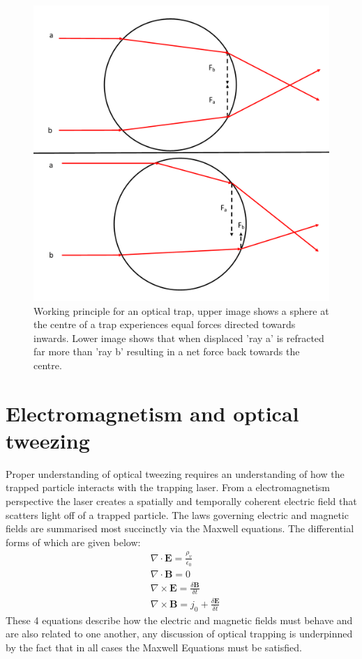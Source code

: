 \documentclass[a4paper,oneside,11pt]{book}
\begin{document}
\begin{figure}[h]
	\centering
	\includegraphics[width=0.65\linewidth]{ot_working_principal.png}
	\caption{Working principle for an optical trap, upper image shows a sphere at the centre of a trap experiences equal forces directed towards inwards. Lower image shows that when displaced 'ray a' is refracted far more than 'ray b' resulting in a net force back towards the centre.}
\end{figure}

\section{Electromagnetism and optical tweezing}
Proper understanding of optical tweezing requires an understanding of how the trapped particle interacts with the trapping laser. From a electromagnetism perspective the laser creates a spatially and temporally coherent electric field that scatters light off of a trapped particle. The laws governing electric and magnetic fields are summarised most succinctly via the Maxwell equations. The differential forms of which are given below:
\begin{align}
	&\nabla \cdot \mathbf{E} = \frac{\rho_ v}{\epsilon_0} \\
	&\nabla \cdot \mathbf{B} = 0 \\
	&\nabla \times \mathbf{E}  = \frac{\delta \mathbf{B}}{\delta t} \\
	&\nabla \times \mathbf{B} = j_0 +\frac{\delta \mathbf{E}}{\delta t}    
\end{align}
These 4 equations describe how the electric and magnetic fields must behave and are also related to one another, any discussion of optical trapping is underpinned by the fact that in all cases the Maxwell Equations must be satisfied. 
\end{document}
